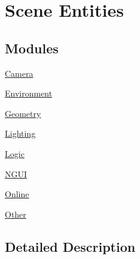 \hypertarget{group__gr__entities}{}\section{Scene Entities}
\label{group__gr__entities}
\subsection*{Modules}
\begin{DoxyCompactItemize}
\item 
\hyperlink{group__gr___camera}{Camera}
\item 
\hyperlink{group__gr___environment}{Environment}
\item 
\hyperlink{group__gr___geometry}{Geometry}
\item 
\hyperlink{group__gr___lighting}{Lighting}
\item 
\hyperlink{group__gr___logic}{Logic}
\item 
\hyperlink{group__gr___n_g_u_i}{N\+G\+UI}
\item 
\hyperlink{group__gr___online}{Online}
\item 
\hyperlink{group__gr___other}{Other}
\end{DoxyCompactItemize}


\subsection{Detailed Description}
